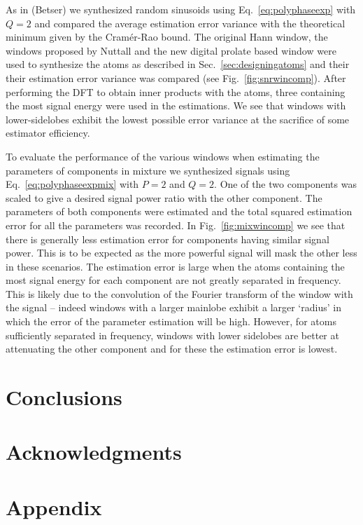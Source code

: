 \documentclass[twoside,a4paper]{article}
\begin{document}
As in (Betser) we synthesized random sinusoids using Eq.~\ref{eq:polyphaseexp}
with $Q=2$ and compared the average estimation error variance with the
theoretical minimum given by the Cram\'{e}r-Rao bound. The original Hann window,
the windows proposed by Nuttall and the new digital prolate based window were
used to synthesize the atoms as described in Sec.~\ref{sec:designingatoms} and
their their estimation error variance was compared (see
Fig.~\ref{fig:snrwincomp}). After performing the DFT to obtain inner products
with the atoms, three containing the most signal energy were used in the
estimations. We see that windows with lower-sidelobes exhibit the lowest
possible error variance at the sacrifice of some estimator efficiency.

\begin{figure*}[ht]
    \centerline{\texttt{[image: \{comp\_offset\_chirp\_est\_err]}.eps}}
\caption{\label{fig:mixwincomp}}
\end{figure*}

To evaluate the performance of the various windows when estimating the
parameters of components in mixture we synthesized signals using
Eq.~\ref{eq:polyphaseexpmix} with $P=2$ and $Q=2$. One of the two components was
scaled to give a desired signal power ratio with the other component. The
parameters of both components were estimated and the total squared estimation
error for all the parameters was recorded. In Fig.~\ref{fig:mixwincomp} we see
that there is generally less estimation error for components having similar
signal power. This is to be expected as the more powerful signal will mask the
other less in these scenarios. The estimation error is large when the atoms
containing the most signal energy for each component are not greatly separated
in frequency. This is likely due to the convolution of the Fourier transform of
the window with the signal -- indeed windows with a larger mainlobe exhibit a
larger `radius' in which the error of the parameter estimation will be high.
However, for atoms sufficiently separated in frequency, windows with lower
sidelobes are better at attenuating the other component and for these the
estimation error is lowest.


\section{Conclusions}

\section{Acknowledgments}

\nocite{*}


\section{Appendix}
\end{document}
